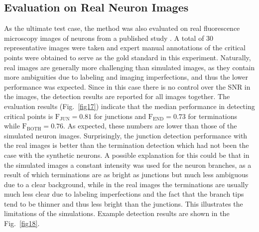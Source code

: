 \subsection{Evaluation on Real Neuron Images}
\label{subsec:experiments-real}
As the ultimate test case, the method was also evaluated on real fluorescence microscopy images of neurons from a published study \cite{steiner2002overexpression}. A total of 30 representative images were taken and expert manual annotations of the critical points were obtained to serve as the gold standard in this experiment. Naturally, real images are generally more challenging than simulated images, as they contain more ambiguities due to labeling and imaging imperfections, and thus the lower performance was expected. Since in this case there is no control over the SNR in the images, the detection results are reported for all images together. The evaluation results (Fig.~\ref{fig17}) indicate that the median performance in detecting critical points is $\textrm{F}_{\textrm{JUN}}=0.81$ for junctions and $\textrm{F}_{\textrm{END}}=0.73$ for terminations while $\textrm{F}_{\textrm{BOTH}}=0.76$. As expected, these numbers are lower than those of the simulated neuron images. Surprisingly, the junction detection performance with the real images is better than the termination detection which had not been the case with the synthetic neurons. A possible explanation for this could be that in the simulated images a constant intensity was used for the neuron branches, as a result of which terminations are as bright as junctions but much less ambiguous due to a clear background, while in the real images the terminations are usually much less clear due to labeling imperfections and the fact that the branch tips tend to be thinner and thus less bright than the junctions. This illustrates the limitations of the simulations. Example detection results are shown in the Fig.~\ref{fig18}.
